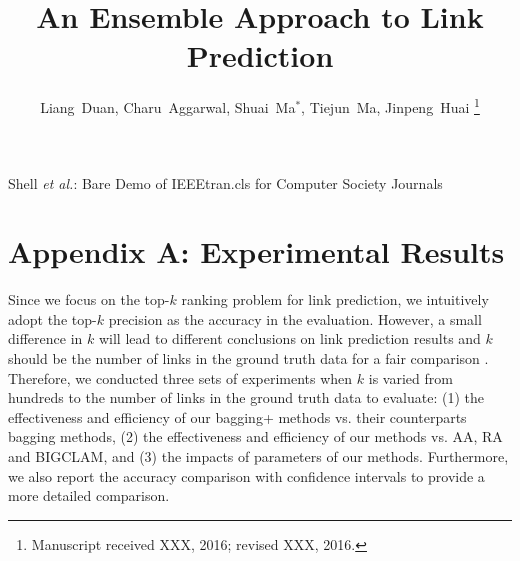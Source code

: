 \documentclass[10pt,journal,compsoc]{IEEEtran}
\newcommand{\Aa}{{\sf AA}\xspace }
\newcommand{\RA}{{\sf RA}\xspace }
\newcommand{\BIGCLAM}{{\sf BIGCLAM}\xspace}
\begin{document}
\title{An Ensemble Approach to Link Prediction}

\author{Liang~Duan,
        Charu~Aggarwal,
        Shuai~Ma$^*$,
        Tiejun~Ma,
        Jinpeng~Huai
\thanks{Manuscript received XXX, 2016; revised XXX, 2016.}}


%
{Shell \MakeLowercase{\textit{et al.}}: Bare Demo of IEEEtran.cls for Computer Society Journals}


\maketitle



\section{Appendix A: Experimental Results}

Since we focus on the top-$k$ ranking problem for link prediction, we intuitively
adopt the top-$k$ precision as the accuracy in the evaluation. However, a small
difference in $k$ will lead to different conclusions on link prediction results
and $k$ should be the number of links in the ground truth data for a fair
comparison \cite{yang2015}. Therefore, we conducted three sets of experiments when
$k$ is varied from hundreds to the number of links in the ground truth data to evaluate:
(1) the effectiveness and efficiency of our bagging+ methods vs. their counterparts
bagging methods, (2) the effectiveness and efficiency of our methods
vs. \Aa, \RA and \BIGCLAM, and (3) the impacts of parameters of our methods.
Furthermore, we also report the accuracy comparison with confidence intervals
to provide a more detailed comparison.
\end{document}
